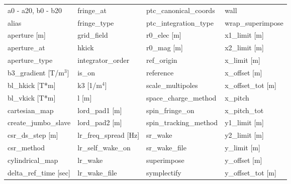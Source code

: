  \begin{tabular}{llll} \toprule
a0 - a20, b0 - b20               & fringe_at                        & ptc_canonical_coords             & wall                             \\
alias                            & fringe_type                      & ptc_integration_type             & wrap_superimpose                 \\
aperture [m]                     & grid_field                       & r0_elec [m]                      & x1_limit [m]                     \\
aperture_at                      & hkick                            & r0_mag [m]                       & x2_limit [m]                     \\
aperture_type                    & integrator_order                 & ref_origin                       & x_limit [m]                      \\
b3_gradient [T/m$^3$]            & is_on                            & reference                        & x_offset [m]                     \\
bl_hkick [T*m]                   & k3 [1/m$^4$]                     & scale_multipoles                 & x_offset_tot [m]                 \\
bl_vkick [T*m]                   & l [m]                            & space_charge_method              & x_pitch                          \\
cartesian_map                    & lord_pad1 [m]                    & spin_fringe_on                   & x_pitch_tot                      \\
create_jumbo_slave               & lord_pad2 [m]                    & spin_tracking_method             & y1_limit [m]                     \\
csr_ds_step [m]                  & lr_freq_spread [Hz]              & sr_wake                          & y2_limit [m]                     \\
csr_method                       & lr_self_wake_on                  & sr_wake_file                     & y_limit [m]                      \\
cylindrical_map                  & lr_wake                          & superimpose                      & y_offset [m]                     \\
delta_ref_time [sec]             & lr_wake_file                     & symplectify                      & y_offset_tot [m]                 \\

\end{tabular}
